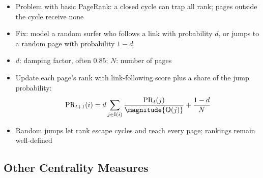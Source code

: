 \begin{itemize}
    \item Problem with basic PageRank: a closed cycle can trap all rank; pages outside the cycle receive none
    \item Fix: model a random surfer who follows a link with probability \(d\), or jumps to a random page with probability \(1-d\)
    \item \(d\): damping factor, often \(0.85\); \(N\): number of pages
    \item Update each page's rank with link-following score plus a share of the jump probability:
          \[
              \PageRank_{t+1}(i)
              = d \sum_{j \in \InboundLinks(i)}
              \frac{\PageRank_t(j)}{\magnitude{\OutboundLinks(j)}}
              + \frac{1-d}{N}
          \]
    \item Random jumps let rank escape cycles and reach every page; rankings remain well-defined
\end{itemize}

\subsection{Other Centrality Measures}

